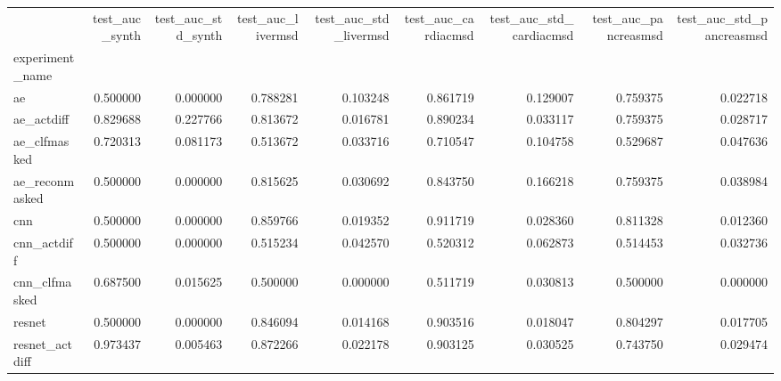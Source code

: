 \begin{tabular}{lrrrrrrrr}
\toprule
{} &  test\_auc\_synth &  test\_auc\_std\_synth &  test\_auc\_livermsd &  test\_auc\_std\_livermsd &  test\_auc\_cardiacmsd &  test\_auc\_std\_cardiacmsd &  test\_auc\_pancreasmsd &  test\_auc\_std\_pancreasmsd \\
experiment\_name  &                 &                     &                    &                        &                      &                          &                       &                           \\
\midrule
ae               &        0.500000 &            0.000000 &           0.788281 &               0.103248 &             0.861719 &                 0.129007 &              0.759375 &                  0.022718 \\
ae\_actdiff       &        0.829688 &            0.227766 &           0.813672 &               0.016781 &             0.890234 &                 0.033117 &              0.759375 &                  0.028717 \\
ae\_clfmasked     &        0.720313 &            0.081173 &           0.513672 &               0.033716 &             0.710547 &                 0.104758 &              0.529687 &                  0.047636 \\
ae\_reconmasked   &        0.500000 &            0.000000 &           0.815625 &               0.030692 &             0.843750 &                 0.166218 &              0.759375 &                  0.038984 \\
cnn              &        0.500000 &            0.000000 &           0.859766 &               0.019352 &             0.911719 &                 0.028360 &              0.811328 &                  0.012360 \\
cnn\_actdiff      &        0.500000 &            0.000000 &           0.515234 &               0.042570 &             0.520312 &                 0.062873 &              0.514453 &                  0.032736 \\
cnn\_clfmasked    &        0.687500 &            0.015625 &           0.500000 &               0.000000 &             0.511719 &                 0.030813 &              0.500000 &                  0.000000 \\
resnet           &        0.500000 &            0.000000 &           0.846094 &               0.014168 &             0.903516 &                 0.018047 &              0.804297 &                  0.017705 \\
resnet\_actdiff   &        0.973437 &            0.005463 &           0.872266 &               0.022178 &             0.903125 &                 0.030525 &              0.743750 &                  0.029474 \\

\end{tabular}
